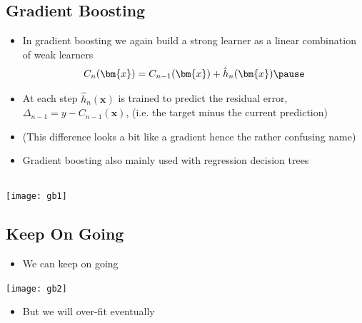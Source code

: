 
\begin{slide}
\section{Gradient Boosting}

\begin{PauseHighLight}
  \begin{itemize}
  \item In gradient boosting we again build a strong learner as a linear
    combination of weak learners
    \begin{align*}
      C_n(\bm{x}) = C_{n-1}(\bm{x}) + \hat{h}_n(\bm{x})\pause
    \end{align*}
  \item At each step $\hat{h}_n(\bm{x})$ is trained to predict the
    residual error, $\Delta_{n-1} = y-C_{n-1}(\bm{x})$, (i.e. the target minus
    the current prediction)\pause
  \item (This difference looks a bit like a gradient hence the rather
    confusing name)\pause
  \item Gradient boosting also mainly used with regression decision trees\pause
  \end{itemize}
\end{PauseHighLight}

\end{slide}


\begin{slide}
\section[-1]{}

\begin{center}
  \texttt{[image: gb1]}
\end{center}
\end{slide}


\begin{slide}
\section{Keep On Going}
\pb
\begin{itemize}
\item We can keep on going
\end{itemize}
\begin{center}
  \texttt{[image: gb2]}\pauseh
\end{center}
\begin{itemize}
\item But we will over-fit eventually\pause
\end{itemize}
\end{slide}

